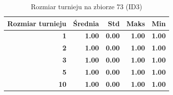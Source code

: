 \begin{table}[htbp]
\centering
\small
\setlength{\tabcolsep}{6pt}
\renewcommand{\arraystretch}{1.2}
\caption{Rozmiar turnieju na zbiorze 73 (ID3)}
\label{tab:ID3_tournament_size_73}
\begin{tabular}{r|r|r|r|r}
\toprule
Rozmiar turnieju & Średnia & Std & Maks & Min \\
\hline
\textbf{1} & \textbf{1.00} & \textbf{0.00} & \textbf{1.00} & \textbf{1.00} \\
\textbf{2} & \textbf{1.00} & \textbf{0.00} & \textbf{1.00} & \textbf{1.00} \\
\textbf{3} & \textbf{1.00} & \textbf{0.00} & \textbf{1.00} & \textbf{1.00} \\
\textbf{5} & \textbf{1.00} & \textbf{0.00} & \textbf{1.00} & \textbf{1.00} \\
\textbf{10} & \textbf{1.00} & \textbf{0.00} & \textbf{1.00} & \textbf{1.00} \\
\bottomrule
\end{tabular}
\end{table}